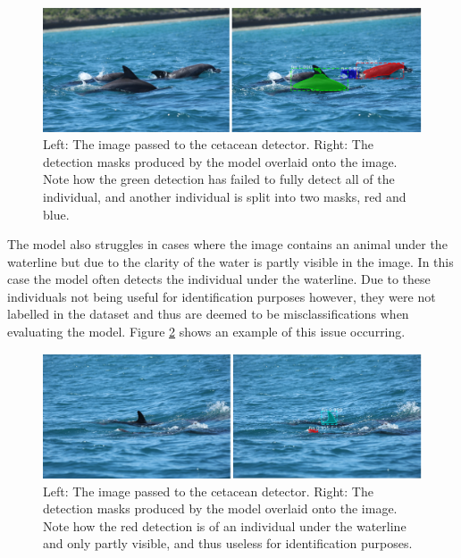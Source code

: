 \begin{figure}[h]
	\begin{center}
		\includegraphics[scale=0.4]{Chapter3/figs/model-fail-bad-detection-and-split-individual.png}
	\end{center}
	\caption{Left: The image passed to the cetacean detector. Right: The detection masks produced by the model overlaid onto the image. Note how the green detection has failed to fully detect all of the individual, and another individual is split into two masks, red and blue.}
	\label{fig:model-fail-bad-detection-and-split-individual}
\end{figure}
 
The model also struggles in cases where the image contains an animal under the waterline but due to the clarity of the water is partly visible in the image. In this case the model often detects the individual under the waterline. Due to these individuals not being useful for identification purposes however, they were not labelled in the dataset and thus are deemed to be misclassifications when evaluating the model. Figure \ref{fig:model-fail-underwater} shows an example of this issue occurring.

\begin{figure}[h]
	\begin{center}
		\includegraphics[scale=0.4]{Chapter3/figs/model-fail-underwater.png}
	\end{center}
	\caption{Left: The image passed to the cetacean detector. Right: The detection masks produced by the model overlaid onto the image. Note how the red detection is of an individual under the waterline and only partly visible, and thus useless for identification purposes. }
	\label{fig:model-fail-underwater}
\end{figure}


